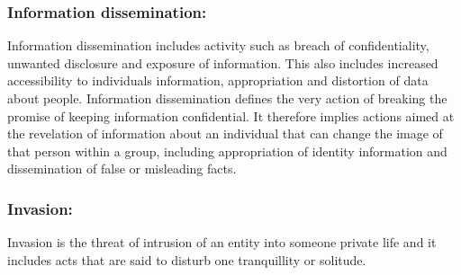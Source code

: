 \subsubsection{Information dissemination:}
Information dissemination includes activity such as breach of confidentiality, unwanted disclosure and exposure of information. This also includes increased accessibility to individuals information, appropriation and distortion of data about people. Information dissemination defines the very action of breaking the promise of keeping information confidential. It therefore implies actions aimed at the revelation of information about an individual that can change the image of that person within a group, including appropriation of identity information and dissemination of false or misleading facts. 
 
\subsubsection{Invasion:}
Invasion is the threat of intrusion of an entity into someone private life and it includes acts that are said to disturb one tranquillity or solitude.

